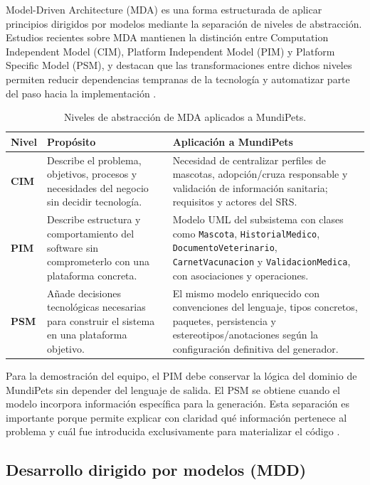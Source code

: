 \documentclass[journal,onecolumn]{IEEEtran}
\begin{document}
	Model-Driven Architecture (MDA) es una forma estructurada de aplicar principios dirigidos por modelos mediante la separación de niveles de abstracción. Estudios recientes sobre MDA mantienen la distinción entre Computation Independent Model (CIM), Platform Independent Model (PIM) y Platform Specific Model (PSM), y destacan que las transformaciones entre dichos niveles permiten reducir dependencias tempranas de la tecnología y automatizar parte del paso hacia la implementación \cite{silega2022cimpim, krouwel2024enterprise}.
	
	\begin{table}[H]
		\caption{Niveles de abstracción de MDA aplicados a MundiPets.}
		\label{tab:mda_niveles}
		\centering
		\begin{tabularx}{\linewidth}{|C{1.5cm}|X|X|}
			\hline
			\textbf{Nivel} & \textbf{Propósito} & \textbf{Aplicación a MundiPets} \\
			\hline
			\textbf{CIM} & Describe el problema, objetivos, procesos y necesidades del negocio sin decidir tecnología. & Necesidad de centralizar perfiles de mascotas, adopción/cruza responsable y validación de información sanitaria; requisitos y actores del SRS. \\
			\hline
			\textbf{PIM} & Describe estructura y comportamiento del software sin comprometerlo con una plataforma concreta. & Modelo UML del subsistema con clases como \texttt{Mascota}, \texttt{HistorialMedico}, \texttt{DocumentoVeterinario}, \texttt{CarnetVacunacion} y \texttt{ValidacionMedica}, con asociaciones y operaciones. \\
			\hline
			\textbf{PSM} & Añade decisiones tecnológicas necesarias para construir el sistema en una plataforma objetivo. & El mismo modelo enriquecido con convenciones del lenguaje, tipos concretos, paquetes, persistencia y estereotipos/anotaciones según la configuración definitiva del generador. \\
			\hline
		\end{tabularx}
	\end{table}
	
	Para la demostración del equipo, el PIM debe conservar la lógica del dominio de MundiPets sin depender del lenguaje de salida. El PSM se obtiene cuando el modelo incorpora información específica para la generación. Esta separación es importante porque permite explicar con claridad qué información pertenece al problema y cuál fue introducida exclusivamente para materializar el código \cite{silega2022cimpim}.
	
	\subsection{Desarrollo dirigido por modelos (MDD)}
	
\end{document}
